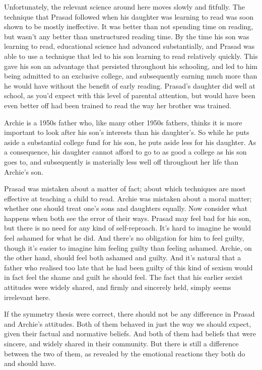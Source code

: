 Unfortunately, the relevant science around here moves slowly and fitfully. The technique that \gls{Prasad} followed when his daughter was learning to read was soon shown to be mostly ineffective. It was better than not spending time on reading, but wasn't any better than unstructured reading time. By the time his son was learning to read, educational science had advanced substantially, and \gls{Prasad} was able to use a technique that led to his son learning to read relatively quickly. This gave his son an advantage that persisted throughout his schooling, and led to him being admitted to an exclusive college, and subsequently earning much more than he would have without the benefit of early reading. \gls{Prasad}'s daughter did well at school, as you'd expect with this level of parental attention, but would have been even better off had been trained to read the way her brother was trained.

\gls{Archie} is a 1950s father who, like many other 1950s fathers, thinks it is more important to look after his son's interests than his daughter's. So while he puts aside a substantial college fund for his son, he puts aside less for his daughter. As a consequence, his daughter cannot afford to go to as good a college as his son goes to, and subsequently is materially less well off throughout her life than \gls{Archie}'s son.

\gls{Prasad} was mistaken about a matter of fact; about which techniques are most effective at teaching a child to read. \gls{Archie} was mistaken about a moral matter; whether one should treat one's sons and daughters equally. Now consider what happens when both see the error of their ways. \gls{Prasad} may feel bad for his son, but there is no need for any kind of self-reproach. It's hard to imagine he would feel ashamed for what he did. And there's no obligation for him to feel guilty, though it's easier to imagine him feeling guilty than feeling ashamed. \gls{Archie}, on the other hand, should feel both ashamed and guilty. And it's natural that a father who realised too late that he had been guilty of this kind of sexism would in fact feel the shame and guilt he should feel. The fact that his earlier sexist attitudes were widely shared, and firmly and sincerely held, simply seems irrelevant here.

If the symmetry thesis were correct, there should not be any difference in \gls{Prasad} and \gls{Archie}'s attitudes. Both of them behaved in just the way we should expect, given their factual and normative beliefs. And both of them had beliefs that were sincere, and widely shared in their community. But there is still a difference between the two of them, as revealed by the emotional reactions they both do and should have.

